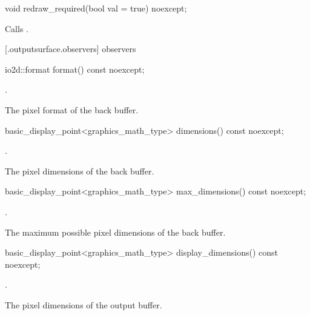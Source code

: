 %
\begin{itemdecl}
void redraw_required(bool val = true) noexcept;
\end{itemdecl}
\begin{itemdescr}
\pnum
\effects Calls .
\end{itemdescr}

 [\iotwod.outputsurface.observers] { observers}

%
\begin{itemdecl}
io2d::format format() const noexcept;
\end{itemdecl}
\begin{itemdescr}
\pnum
\returns {}.

\pnum
\remarks The pixel format of the back buffer.
\end{itemdescr}

%
\begin{itemdecl}
basic_display_point<graphics_math_type> dimensions() const noexcept;
\end{itemdecl}
\begin{itemdescr}
\pnum
\returns {}.

\pnum
\remarks The pixel dimensions of the back buffer.
\end{itemdescr}

%
\begin{itemdecl}
basic_display_point<graphics_math_type> max_dimensions() const noexcept;
\end{itemdecl}
\begin{itemdescr}
\pnum
\returns {}.

\pnum
\remarks The maximum possible pixel dimensions of the back buffer.
\end{itemdescr}

%
\begin{itemdecl}
basic_display_point<graphics_math_type> display_dimensions() const noexcept;
\end{itemdecl}
\begin{itemdescr}
\pnum
\returns {}.

\pnum
\remarks The pixel dimensions of the output buffer.
\end{itemdescr}

